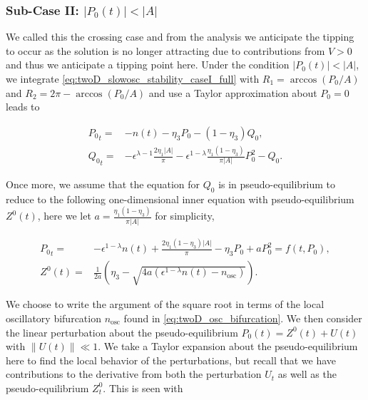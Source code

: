 \subsubsection{Sub-Case II: $|P_0(t)|<|A|$}

We called this the crossing case and from the analysis we anticipate the tipping to occur as the solution is no longer attracting due to contributions from $V>0$ and thus we anticipate a tipping point here. Under the condition $|P_0(t)|<|A|$, we integrate \eqref{eq:twoD_slowosc_stability_caseI_full} with $R_1=\arccos(P_0/A)$ and $R_2=2\pi-\arccos(P_0/A)$ and use a Taylor approximation about $P_0=0$ leads to 

\begin{equation}\label{eq:twoD_slowosc_stability_subcaseII,full}
\begin{aligned}
{P_0}_t =& -n(t)-\eta_3 P_0-(1-\eta_3)Q_0,\\
{Q_0}_t =&-\epsilon^{\lambda-1}\frac{2\eta_1|A|}{\pi}-\epsilon^{1-\lambda}\frac{\eta_1(1-\eta_3)}{\pi|A|}P_0^2-Q_0.
\end{aligned}
\end{equation}

Once more, we assume that the equation for $Q_0$ is in pseudo-equilibrium 
to reduce to the following one-dimensional inner equation with pseudo-equilibrium $Z^0(t)$, here we let $a=\frac{\eta_1(1-\eta_3)}{\pi|A|}$ for simplicity,

\begin{equation}\label{eq:twoD_slowosc_stability_subcaseII,reduced}
\begin{aligned}
{P_0}_t =& -\epsilon^{1-\lambda}n(t)+\frac{2\eta_1(1-\eta_3)|A|}{\pi}-\eta_3 P_0+aP_0^2=f(t,P_0),\\
Z^0(t) =& \frac{1}{2a}\left(\eta_3-\sqrt{4a(\epsilon^{1-\lambda}n(t)-n_{\text{osc}})}\right).
\end{aligned}
\end{equation}

We choose to write the argument of the square root in terms of the local oscillatory bifurcation ${n}_{\text{osc}}$ found in \eqref{eq:twoD_osc_bifurcation}. We then consider the linear perturbation about the pseudo-equilibrium $P_0(t)= Z^0(t)+U(t)$ with $\lVert U(t)\rVert \ll 1$. We take a Taylor expansion about the pseudo-equilibrium here to find the local behavior of the perturbations, but recall that we have contributions to the derivative from both the perturbation $U_t$ as well as the pseudo-equilibrium $Z^0_t$. This is seen with

